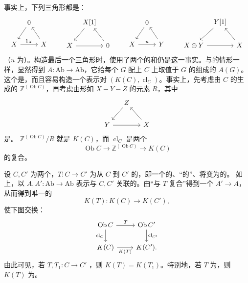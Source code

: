 事实上，下列三角形都是：
\[
\begin{tikzcd}[column sep=tiny]
&0\arrow[dl]&\\
X\arrow[rr,"1_X"]&&X\arrow[ul]
\end{tikzcd}
\qquad
\begin{tikzcd}[column sep=tiny]
&X[1]\arrow[dl]&\\
X\arrow[rr]&&0\arrow[ul]
\end{tikzcd}
\qquad
\begin{tikzcd}[column sep=tiny]
&0\arrow[dl]&\\
X\arrow[rr,"u"]&&Y\arrow[ul]
\end{tikzcd}
\qquad
\begin{tikzcd}[column sep=tiny]
&Y[1]\arrow[dl]&\\
X\oplus Y\arrow[rr]&&X\arrow[ul]
\end{tikzcd}
\]
（$u$ 为）。构造最后一个三角形时，使用了两个的和仍是这一事实。与的情形一样，显然得到 $A:\mathrm{Ab}\to\mathrm{Ab}$，它给每个 $G$ 配上 $C$ 上取值于 $G$ 的组成的 $A(G)$。这个是，而且容易构造一个表示对 $(K(C),\operatorname{cl}_C)$。事实上，先考虑由 $C$ 的生成的 $\mathbb Z^{(\operatorname{Ob}C)}$，再考虑由形如 $X-Y-Z$ 的元素 $R$，其中
\[
\begin{tikzcd}[column sep=small]
&Z\arrow[dl]&\\
Y\arrow[rr]&&X\arrow[ul]
\end{tikzcd}
\]
是。 $\mathbb Z^{(\operatorname{Ob}C)}/R$ 就是 $K(C)$，而 $\operatorname{cl}_C$ 是两个
\[
\operatorname{Ob}C\longrightarrow\mathbb Z^{(\operatorname{Ob}C)}\longrightarrow K(C)
\]
的复合。

设 $C,C'$ 为两个，$T:C\to C'$ 为从 $C$ 到 $C'$ 的，即一个的、“的”、将变为的。
如上，以 $A,A':\mathrm{Ab}\to\mathrm{Ab}$ 表示与 $C,C'$ 关联的。由“与 $T$ 复合”得到一个 $A'\to A$，从而得到唯一的
\[
K(T):K(C)\longrightarrow K(C'),
\]
使下图交换：
\[
\begin{tikzcd}
\operatorname{Ob}C\arrow[r,"T"]\arrow[d,"\operatorname{cl}_C"']&\operatorname{Ob}C'\arrow[d,"\operatorname{cl}_{C'}"]\\
K(C)\arrow[r,"K(T)"']&K(C').
\end{tikzcd}
\]
由此可见，若 $T,T_1:C\to C'$ ，则 $K(T)=K(T_1)$。特别地，若 $T$ 为，则 $K(T)$ 为。

